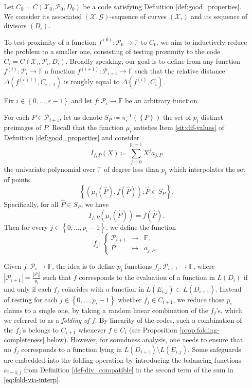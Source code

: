 \documentclass[10pt,a4paper]{article}
\renewcommand\hat{\widehat}
\newcommand\F{\mathbb{F}}
\renewcommand{\hat}{\widehat}
\renewcommand{\vec}[1]{\boldsymbol{#1}}
\newcommand{\set}[1]{\left\{#1\right\}}
\newcommand{\size}[1]{\left|#1\right|}
\newcommand{\range}[1]{\set{0,\dots,#1-1}}
\newcommand\calX{\mathcal{X}}
\newcommand\calP{\mathcal{P}}
\newcommand\calG{\mathcal{G}}
\newcommand\XGseq{(\calX, \vec{\calG})}
\newcommand\mydef{\coloneqq}
\theoremstyle{plain}
\theoremstyle{plain}
\theoremstyle{definition}
\theoremstyle{remark}
\theoremstyle{plain}
\begin{document}
Let $C_0 = C(\calX_0,\calP_0,D_0)$ be a code satisfying Definition \ref{def:good_properties}. We consider its associated $\XGseq$-sequence of curves $(\calX_i)$ and its sequence of divisors $(D_i)$. 

To test proximity of a function ${f^{(0)} : \calP_0 \rightarrow \F}$ to $C_0$, we aim to inductively reduce the problem to a smaller one, consisting of testing proximity to the code $C_i = C(\calX_i,\calP_i,D_i)$. Broadly speaking, our goal is to define from any function $f^{(i)} : \calP_i \rightarrow \F$ a function $f^{(i+1)} : \calP_{i+1} \rightarrow \F$ such that the relative distance $\Delta(f^{(i+1)}, C_{i+1})$ is roughly equal to $\Delta(f^{(i)}, C_i)$.

Fix $i \in \range{r}$ and let $f : \calP_i \rightarrow \F$ be an arbitrary function. 

\begin{notation}\label{not:IfP}
	For each $P \in \calP_{i+1}$, let us denote ${S_P \mydef \pi_i^{-1}(\set{P})}$ the set of $p_i$ distinct preimages of $P$.     Recall that the function $\mu_i$ satisfies Item \ref{sit:dif-values} of Definition \ref{def:good_properties} and consider 
	\begin{equation}\label{eq:IfP}
		I_{f,P}(X)\mydef\sum_{j=0}^{p_i-1} X^j a_{j,P} 
	\end{equation} 
	the univariate polynomial over $\F$ of degree less than $p_i$ which interpolates the set of points \[\set{(\mu_i(\hat P), f(\hat P)) ; \hat P \in S_P}.\] 
	Specifically, for all $\hat P \in S_P$, we have
	\[
	I_{f, P}(\mu_i(\hat P)) = f(\hat P).
	\]    
	Then for every $j \in \range{p_i}$, we define the function 
	\begin{equation}\label{eq:coeff-fj}
		f_j:\left\{\begin{array}{ccc}
			\calP_{i+1} &\rightarrow& \F, \\
			P &\mapsto & a_{j,P}.
		\end{array}\right.
	\end{equation}
\end{notation}

Given $f : \calP_i \rightarrow \F$, the idea is to define $p_i$ functions $f_j : \calP_{i+1} \rightarrow \F$, where $\size{\calP_{i+1}} = \frac{\size{\calP_i}}{p_{i}}$ such that $f$ corresponds to the evaluation of a function in $L(D_i)$ if and only if each $f_j$ coincides with a function in $L(E_{i, j}) \subset L(D_{i+1})$. Instead of testing for each $j \in \range{p_i}$ whether $f_j \in C_{i+1}$, we reduce those $p_i$ claims to a single one, by taking a random linear combination of the $f_j$'s, which we referred to as a \emph{folding of $f$}. By linearity of the codes, such a combination of the $f_j$'s belongs to $C_{i+1}$ whenever $f \in C_i$ (see Proposition \ref{prop:folding-completeness} below). However, for soundness analysis,  one needs to ensure that no $f_j$ corresponds to a function lying in $L(D_{i+1}) \setminus L(E_{i,j})$. Some safeguards are embedded into the folding operation by introducing the balancing functions $\nu_{i+1,j}$ from Definition \ref{def-div_compatible} in the second term of the sum in \eqref{eq:fold-via-interp}.
\end{document}
